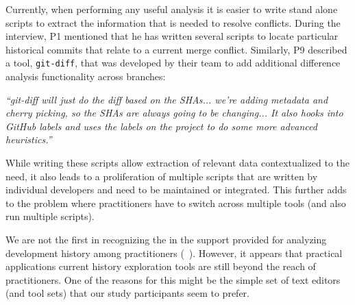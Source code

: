 Currently, when performing any useful analysis it is easier to write stand alone scripts to extract the information that is needed to resolve conflicts. During the interview, P1 mentioned that he has written several scripts to locate particular historical commits that relate to a current merge conflict. Similarly, P9 described a tool, \texttt{git-diff}, that was developed by their team to add additional difference analysis functionality across branches:
\begin{displayquote}
\textit{``git-diff will just do the diff based on the SHAs... we're adding metadata and cherry picking, so the SHAs are always going to be changing... It also hooks into GitHub labels and uses the labels on the project to do some more advanced heuristics.''}
\end{displayquote}

While writing these scripts allow extraction of relevant data contextualized to the need, it also leads to a proliferation of multiple scripts that are written by individual developers and need to be maintained or integrated. This further adds to the problem where practitioners have to switch across multiple tools (and also run multiple scripts).

We are not the first in recognizing the in the support provided for analyzing development history among practitioners (~\cite{sun2015informationhistory, guo2016cold-start, yan2014miningcontracts}). However, it appears that practical applications current history exploration tools are still beyond the reach of practitioners. One of the reasons for this might be the simple set of text editors (and tool sets) that our study participants seem to prefer.

